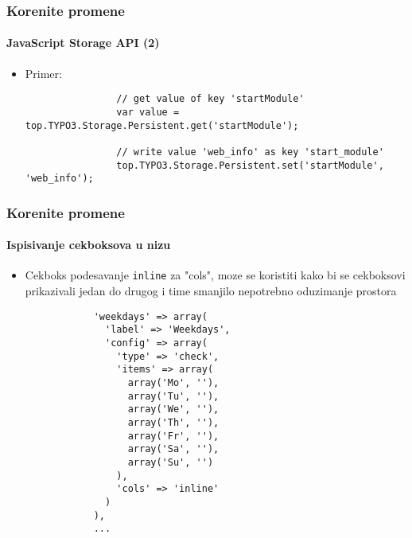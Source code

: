 \begin{frame}[fragile]
	\frametitle{Korenite promene}
	\framesubtitle{JavaScript Storage API (2)}

	\begin{itemize}
		\item Primer:
			\begin{lstlisting}
				// get value of key 'startModule'
				var value = top.TYPO3.Storage.Persistent.get('startModule');

				// write value 'web_info' as key 'start_module'
				top.TYPO3.Storage.Persistent.set('startModule', 'web_info');
			\end{lstlisting}

	\end{itemize}

\end{frame}


\begin{frame}[fragile]
	\frametitle{Korenite promene}
	\framesubtitle{Ispisivanje cekboksova u nizu}

	\lstset{basicstyle=\tiny\ttfamily}

	\begin{itemize}

		\item Cekboks podesavanje \texttt{inline} za "cols", moze se koristiti kako bi se cekboksovi prikazivali jedan do drugog
			i time smanjilo nepotrebno oduzimanje prostora

		\begin{lstlisting}
			'weekdays' => array(
			  'label' => 'Weekdays',
			  'config' => array(
			    'type' => 'check',
			    'items' => array(
			      array('Mo', ''),
			      array('Tu', ''),
			      array('We', ''),
			      array('Th', ''),
			      array('Fr', ''),
			      array('Sa', ''),
			      array('Su', '')
			    ),
			    'cols' => 'inline'
			  )
			),
			...
		\end{lstlisting}

	\end{itemize}

\end{frame}

